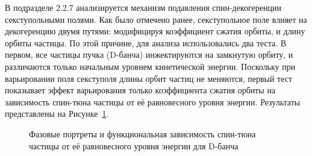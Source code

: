 В подразделе 2.2.7 анализируется механизм подавления спин-декогеренции секступольными полями. 
Как было отмечено ранее, секступольное поле влияет на декогеренцию двумя путями: 
модифицируя коэффициент сжатия орбиты, и длину орбиты частицы.
По этой причине, для анализа использовались два теста. В первом, все частицы пучка (D-банча) 
инжектируются на замкнутую орбиту, и различаются только начальным уровнем кинетической энергии. 
Поскольку при варьировании поля секступоля длины орбит частиц не меняются, первый тест 
показывает эффект варьирования только коэффициента сжатия орбиты на зависимость спин-тюна частицы
от её равновесного уровня энергии. Результаты представлены на Рисунке~\ref{fig:decoh_anal:D-bunch}.
\begin{figure}[H]\centering
\caption{Фазовые портреты и функциональная зависимость спин-тюна частицы от её равновесного уровня энергии для D-банча\label{fig:decoh_anal:D-bunch}}
\end{figure}

